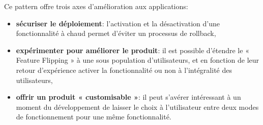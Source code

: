       Ce pattern offre trois axes d'amélioration aux applications:\\

      \begin{itemize}
        \item \textbf{sécuriser le déploiement}: l'activation et la désactivation d'une fonctionnalité à chaud permet d'éviter un processus de rollback,
        \item \textbf{expérimenter pour améliorer le produit}: il est possible d'étendre le « Feature Flipping » à une sous population d'utilisateurs, et en fonction de leur retour d'expérience activer la fonctionnalité ou non à l'intégralité des utilisateurs,
        \item \textbf{offrir un produit « customisable »}: il peut s'avérer intéressant à un moment du développement de laisser le choix à l'utilisateur entre deux modes de fonctionnement pour une même fonctionnalité.\\
      \end{itemize}
